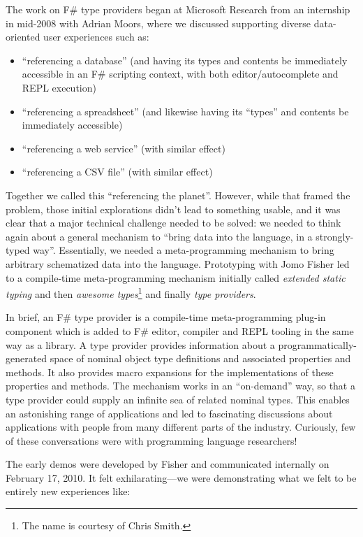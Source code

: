 \documentclass[acmsmall]{acmart}\settopmatter{}
\begin{document}
The work on F\# type providers began at Microsoft Research from an internship in mid-2008 with Adrian Moors, where we discussed
supporting diverse data-oriented user experiences such as:

\begin{itemize}
\item “referencing a database” (and having its types and contents be immediately accessible in an F\# scripting context, with both editor/autocomplete and REPL execution)
\item “referencing a spreadsheet” (and likewise having its “types” and contents be immediately accessible)
\item “referencing a web service” (with similar effect)
\item “referencing a CSV file” (with similar effect)
\end{itemize}

Together we called this “referencing the planet”.  However, while that framed the problem, those initial explorations didn’t lead
to something usable, and it was clear that a major technical challenge needed to be solved: we needed to think again about a
general mechanism to “bring data into the language, in a strongly-typed way”.  Essentially, we needed a meta-programming
mechanism to bring arbitrary schematized data into the language. Prototyping with Jomo Fisher led to a compile-time meta-programming
mechanism initially called \textit{extended static typing} and then \textit{awesome types}\footnote{The name is courtesy of Chris Smith.} and finally \textit{type providers}. 

In brief, an F\# type provider is a compile-time meta-programming plug-in component which is added to F\# editor, compiler
and REPL tooling in the same way as a library. A type provider provides information about a programmatically-generated space
of nominal object type definitions and associated properties and methods.  It also provides macro expansions for the implementations
of these properties and methods. The mechanism works in an “on-demand” way, so that a type provider could supply an infinite
sea of related nominal types.  This enables an astonishing range of applications and led to fascinating discussions about applications
with people from many different parts of the industry.  Curiously, few of these conversations were with programming language researchers!

The early demos were developed by Fisher and communicated internally on February 17, 2010. It felt exhilarating---we were demonstrating
what we felt to be entirely new experiences like:
\end{document}
